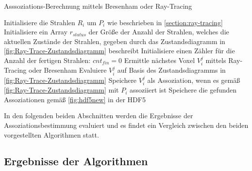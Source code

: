 \begin{algorithm}[H]
\caption{Asssoziations-Berechnung mittels Bresenham oder Ray-Tracing} \label{pseudo:associations}
\begin{algorithmic}[1]
	\State Initialisiere die Strahlen $R_i$ um $P_{i}$ wie beschrieben in \ref{section:ray-tracing}
	\State Initialisiere ein Array $r_{status}$ der Größe der Anzahl der Strahlen, welches die aktuellen Zustände der Strahlen, gegeben durch das Zustandsdiagramm in \ref{fig:Ray-Trace-Zustandsdiagramm} beschreibt
	\State Initialisiere einen Zähler für die Anzahl der fertigen Strahlen: $cnt_{fin} = 0$
			\State Ermittle nächstes Voxel $V_i^j$ mittels Ray-Tracing oder Bresenham
			\State Evaluiere $V_i^j$ auf Basis des Zustandsdiagramms in \ref{fig:Ray-Trace-Zustandsdiagramm}
			\State Speichere $V_i^j$ als Assoziation, wenn es gemäß \ref{fig:Ray-Trace-Zustandsdiagramm} mit $P_i$ assoziiert ist
		\EndFor \label{Rays-Loop}
	\EndWhile
	\State Speichere die gefunden Assoziationen gemäß \ref{fig:hdf5new} in der HDF5
\EndProcedure
\end{algorithmic}
\end{algorithm}

In den folgenden beiden Abschnitten werden die Ergebnisse der Assoziationsbestimmung evaluiert und es findet ein Vergleich zwischen den beiden vorgestellten Algorithmen statt.

\subsection{Ergebnisse der Algorithmen}
\label{section:association_results}

